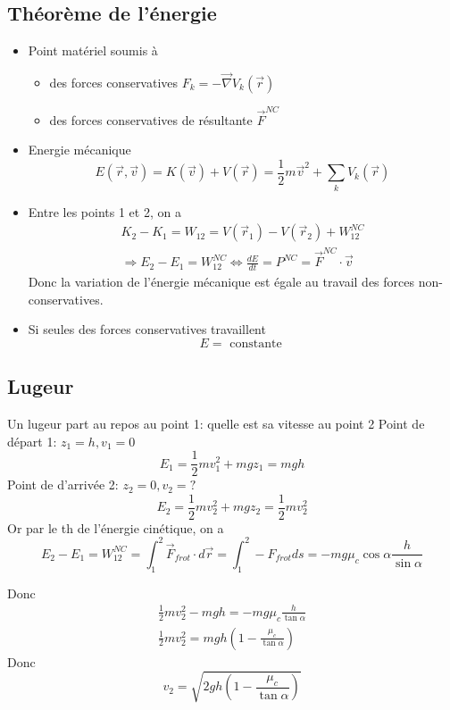 \documentclass[../main.tex]{subfiles}
\begin{document}
\subsection{Théorème de l'énergie}
\begin{itemize}
\item Point matériel soumis à 
	\begin{itemize}
		\item des forces  conservatives $F_k = - \vec{\nabla} V_k ( \vec{r}) $ 
		\item des forces conservatives de résultante $\vec{F}^{NC}$
	\end{itemize}
	

\item Energie mécanique
	\[ 
		E( \vec{r},\vec{v})  = K( \vec{v}) + V( \vec{r}) = \frac{1}{2}m \vec{v}^{2} + \sum_k V_k ( \vec{r}) 
	\]
	
\item Entre les points 1 et 2, on a 
	\begin{align*}
	K_2 - K_1 = W_{12} = V( \vec{r}_1) - V( \vec{r}_2) + W_{12}^{NC}\\
	\Rightarrow E_2 - E_1 = W_{12}^{NC}\iff  \frac{dE}{dt} = P^{NC} = \vec{F}^{NC} \cdot  \vec{v}
	\end{align*}
	Donc la variation de l'énergie mécanique est égale au travail des forces non-conservatives.
	
\item Si seules des forces conservatives travaillent
	\[ 
	E= \text{ constante } 
	\]

	
\end{itemize}
\subsection{Lugeur}
Un lugeur part au repos au point 1: quelle est sa vitesse au point 2
Point de départ 1: $z_1 = h, v_1=0$ 
\[ 
E_1 = \frac{1}{2}m v_1^{2} + mg z_1 = mgh
\]
Point de d'arrivée 2: $z_2 = 0, v_2 =?$ 
\[ 
E_2 = \frac{1}{2}m v_2^{2} + mgz_2= \frac{1}{2}mv_2^{2}
\]
Or par le th de l'énergie cinétique, on a 
\[ 
E_2 - E_1 = W_{12}^{NC}= \int_{ 1 }^{ 2 } \vec{F} _{frot} \cdot d \vec{r} = \int_{ 1 }^{ 2 } - F_{frot} ds = -mg \mu_c \cos \alpha \frac{h}{\sin \alpha}
\]

Donc
\begin{align*}
\frac{1}{2}mv_2^{2} - mgh = -mg \mu_c \frac{h}{\tan \alpha}\\
\frac{1}{2} mv_2^{2} = mgh ( 1 - \frac{\mu_c}{\tan \alpha}) 
\end{align*}
Donc
\[ 
	v_2 = \sqrt { 2gh ( 1- \frac{\mu_c}{\tan \alpha}) } 
\]
\end{document}
